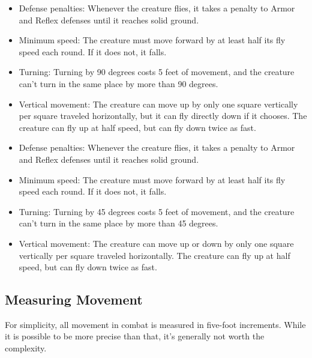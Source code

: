             \begin{itemize}
                \item Defense penalties: Whenever the creature flies, it takes a  penalty to Armor and Reflex defenses until it reaches solid ground.
                \item Minimum speed: The creature must move forward by at least half its fly speed each round. If it does not, it falls.
                \item Turning: Turning by 90 degrees costs 5 feet of movement, and the creature can't turn in the same place by more than 90 degrees.
                \item Vertical movement: The creature can move up by only one square vertically per square traveled horizontally, but it can fly directly down if it chooses.
                    The creature can fly up at half speed, but can fly down twice as fast.
            \end{itemize}

            \begin{itemize}
                \item Defense penalties: Whenever the creature flies, it takes a  penalty to Armor and Reflex defenses until it reaches solid ground.
                \item Minimum speed: The creature must move forward by at least half its fly speed each round. If it does not, it falls.
                \item Turning: Turning by 45 degrees costs 5 feet of movement, and the creature can't turn in the same place by more than 45 degrees.
                \item Vertical movement: The creature can move up or down by only one square vertically per square traveled horizontally.
                    The creature can fly up at half speed, but can fly down twice as fast.
            \end{itemize}

    \subsection{Measuring Movement}

        For simplicity, all movement in combat is measured in five-foot increments.
        While it is possible to be more precise than that, it's generally not worth the complexity.

